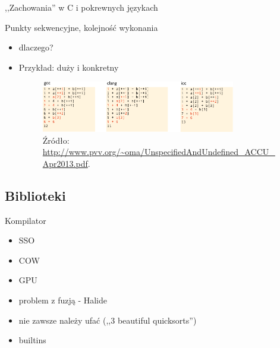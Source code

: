 \begin{frame}{,,Zachowania'' w C i pokrewnych językach}
\begin{block}{Punkty sekwencyjne, kolejność wykonania}
\begin{itemize}
			\item dlaczego?
			\item Przykład: duży i konkretny
			\begin{figure}[h]
				\includegraphics[width=0.8\textwidth]{gfx/unspec_compilers}
				\caption{Źródło: \url{http://www.pvv.org/~oma/UnspecifiedAndUndefined_ACCU_Apr2013.pdf}.}
			\end{figure}
		\end{itemize}
	\end{block}
\end{frame}
\subsection{Biblioteki}
\begin{frame}[fragile]{Kompilator}
	\begin{itemize}
		\item SSO
		\item COW
		\item GPU
		\item problem z fuzją - Halide
		\item nie zawsze należy ufać (,,3 beautiful quicksorts'')
		\item builtins
	\end{itemize}
\end{frame}
